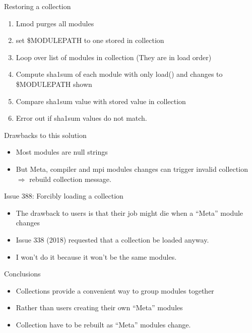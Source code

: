 \documentclass{beamer}
\begin{document}
\begin{frame}{Restoring a collection}
  \begin{enumerate}
    \item Lmod purges all modules
    \item set \$MODULEPATH to one stored in collection
    \item Loop over list of modules in collection (They are in
      load order)
    \item Compute sha1sum of each module with only load() and changes to
      \$MODULEPATH shown
    \item Compare sha1sum value with stored value in collection
    \item Error out if sha1sum values do not match.
  \end{enumerate}
\end{frame}

\begin{frame}{Drawbacks to this solution}
  \begin{itemize}
    \item Most modules are null strings
    \item But Meta, compiler and mpi modules changes can trigger
      invalid collection $\Rightarrow$ rebuild collection message.
  \end{itemize}
\end{frame}

\begin{frame}{Issue 388: Forcibly loading a collection}
  \begin{itemize}
    \item The drawback to users is that their job might die when
      a ``Meta'' module changes
    \item Issue 338 (2018) requested that a collection be loaded anyway.
    \item I won't do it because it won't be the same modules.
  \end{itemize}
\end{frame}

\begin{frame}{Conclusions}
  \begin{itemize}
    \item Collections provide a convenient way to group modules together
    \item Rather than users creating their own ``Meta'' modules
    \item Collection have to be rebuilt as ``Meta'' modules change.
  \end{itemize}
\end{frame}
\end{document}
